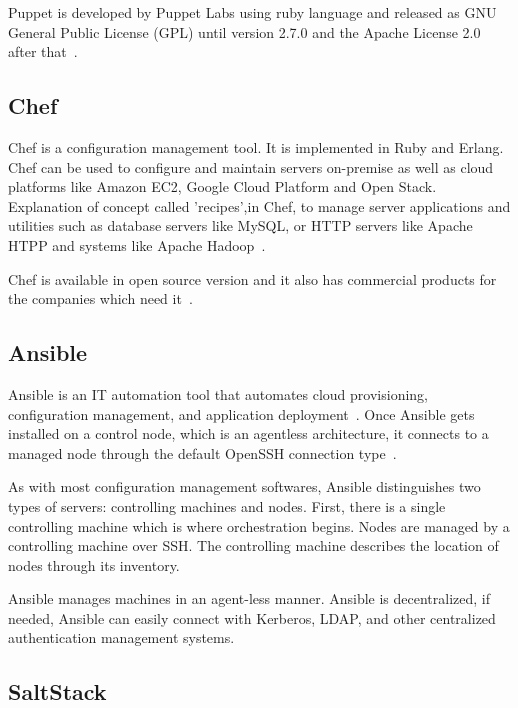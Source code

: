 {Puppet is developed by Puppet Labs using ruby language and released as
GNU General Public License (GPL) until version 2.7.0 and the Apache
License 2.0 after that~\cite{www-puppet-wiki-puppet}.

     \pv
	
\subsection{Chef}

Chef is a configuration management tool. It is implemented in Ruby and
Erlang. Chef can be used to configure and maintain servers on-premise
as well as cloud platforms like Amazon EC2, Google Cloud Platform and
Open Stack. Explanation of concept called 'recipes',in Chef, to
manage server applications and utilities such as database servers like
MySQL, or HTTP servers like Apache HTPP and systems like Apache
Hadoop~\cite{chef-book}.

Chef is available in open source version and it also has commercial
products for the companies which need it~\cite{www-chef-commercial}.

     \pv

\subsection{Ansible}

Ansible is an IT automation tool that automates cloud provisioning,
configuration management, and application
deployment~\cite{www-ansible}. Once Ansible gets installed on a
control node, which is an agentless architecture, it connects to a
managed node through the default OpenSSH connection
type~\cite{www-ansible-wikipedia}.

     As with most configuration management softwares, Ansible
     distinguishes two types of servers: controlling machines and
     nodes. First, there is a single controlling machine which is
     where orchestration begins. Nodes are managed by a controlling
     machine over SSH. The controlling machine describes the location
     of nodes through its inventory.

     Ansible manages machines in an agent-less manner. Ansible is
     decentralized, if needed, Ansible can easily connect with
     Kerberos, LDAP, and other centralized authentication management
     systems.

     \pv

\subsection{SaltStack}

}
